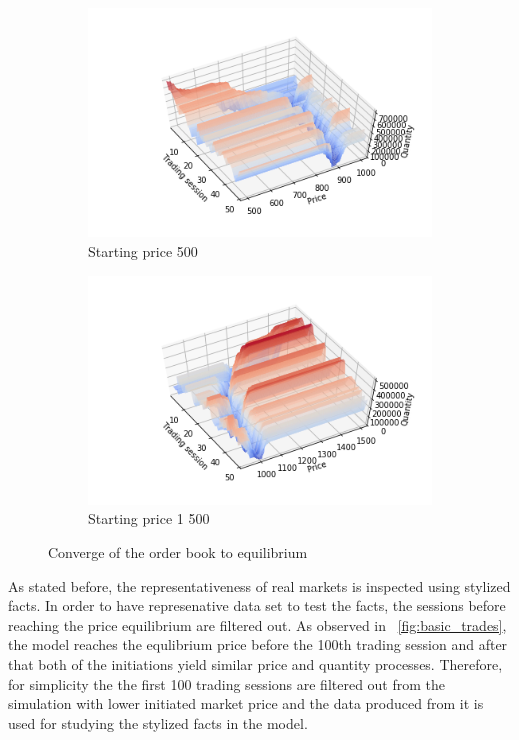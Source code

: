 \begin{figure}
    \centering
    \begin{subfigure}{.5\textwidth}
      \centering
      \includegraphics[width=\linewidth]{plots/basic_market_depth_converge_lower.png}
      \caption{Starting price 500}
      \label{fig:market_depth_lower}
    \end{subfigure}%
    \begin{subfigure}{.5\textwidth}
      \centering
      \includegraphics[width=\linewidth]{plots/basic_market_depth_converge_higher.png}
      \caption{Starting price 1 500}
      \label{fig:market_depth_higher}
    \end{subfigure}
    \caption{Converge of the order book to equilibrium}
    \label{fig:market_depths}
\end{figure}


As stated before, the representativeness of real markets is inspected using
stylized facts. In order to have represenative data set to test the facts, the
sessions before reaching the price equilibrium are filtered out. 
As observed in ~\ref{fig:basic_trades}, the model reaches the equlibrium 
price before the 100th trading session and after that both of the initiations 
yield similar price and quantity processes. Therefore, for simplicity the
the first 100 trading sessions are filtered out from the simulation with
lower initiated market price and the data produced from it is used for 
studying the stylized facts in the model.

